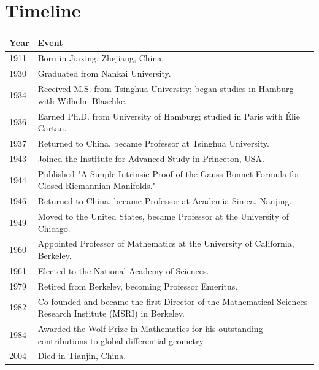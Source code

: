 \section*{Timeline}
\begin{tabularx}{\linewidth}{|p{1.5cm}|>{\raggedright\arraybackslash}X|}
\hline
\textbf{Year} & \textbf{Event} \\ \hline
1911 & Born in Jiaxing, Zhejiang, China. \\ \hline
1930 & Graduated from Nankai University. \\ \hline
1934 & Received M.S. from Tsinghua University; began studies in Hamburg with Wilhelm Blaschke. \\ \hline
1936 & Earned Ph.D. from University of Hamburg; studied in Paris with Élie Cartan. \\ \hline
1937 & Returned to China, became Professor at Tsinghua University. \\ \hline
1943 & Joined the Institute for Advanced Study in Princeton, USA. \\ \hline
1944 & Published "A Simple Intrinsic Proof of the Gauss-Bonnet Formula for Closed Riemannian Manifolds." \\ \hline
1946 & Returned to China, became Professor at Academia Sinica, Nanjing. \\ \hline
1949 & Moved to the United States, became Professor at the University of Chicago. \\ \hline
1960 & Appointed Professor of Mathematics at the University of California, Berkeley. \\ \hline
1961 & Elected to the National Academy of Sciences. \\ \hline
1979 & Retired from Berkeley, becoming Professor Emeritus. \\ \hline
1982 & Co-founded and became the first Director of the Mathematical Sciences Research Institute (MSRI) in Berkeley. \\ \hline
1984 & Awarded the Wolf Prize in Mathematics for his outstanding contributions to global differential geometry. \\ \hline
2004 & Died in Tianjin, China. \\ \hline
\end{tabularx}


